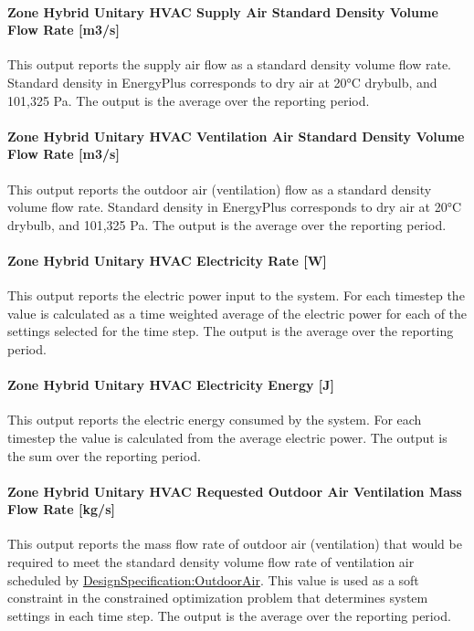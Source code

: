 \paragraph{Zone Hybrid Unitary HVAC Supply Air Standard Density Volume Flow Rate [m3/s]}
This output reports the supply air flow as a standard density volume flow rate. Standard density in EnergyPlus corresponds to dry air at 20\si{\degreeCelsius} drybulb, and 101,325 Pa. The output is the average over the reporting period.

\paragraph{Zone Hybrid Unitary HVAC Ventilation Air Standard Density Volume Flow Rate [m3/s]}
This output reports the outdoor air (ventilation) flow as a standard density volume flow rate. Standard density in EnergyPlus corresponds to dry air at 20\si{\degreeCelsius} drybulb, and 101,325 Pa. The output is the average over the reporting period.

\paragraph{Zone Hybrid Unitary HVAC Electricity Rate [W]}
This output reports the electric power input to the system. For each timestep the value is calculated as a time weighted average of the electric power for each of the settings selected for the time step. The output is the average over the reporting period.

\paragraph{Zone Hybrid Unitary HVAC Electricity Energy [J]}
This output reports the electric energy consumed by the system. For each timestep the value is calculated from the average electric power. The output is the sum over the reporting period.

\paragraph{Zone Hybrid Unitary HVAC Requested Outdoor Air Ventilation Mass Flow Rate [kg/s]}
This output reports the mass flow rate of outdoor air (ventilation) that would be required to meet the standard density volume flow rate of ventilation air scheduled by \hyperref[designspecificationoutdoorair]{DesignSpecification:OutdoorAir}. This value is used as a soft constraint in the constrained optimization problem that determines system settings in each time step. The output is the average over the reporting period.

